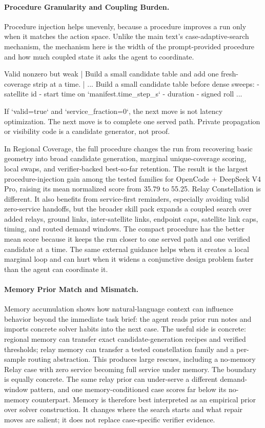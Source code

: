 \documentclass[]{mosi}
\newenvironment{promptblock}
  {\VerbatimEnvironment\par\smallskip\Needspace{10\baselineskip}\noindent\begin{promptblockinner}}
  {\end{promptblockinner}\par\smallskip}
\begin{document}
\paragraph{Procedure Granularity and Coupling Burden.} Procedure injection helps unevenly, because a procedure improves a run only when it matches the action space. Unlike the main text's case-adaptive-search mechanism, the mechanism here is the width of the prompt-provided procedure and how much coupled state it asks the agent to coordinate.
\begin{promptblock}
Valid nonzero but weak | Build a small candidate table and add one
fresh-coverage strip at a time. |
...
Build a small candidate table before dense sweeps:
- satellite id
- start time on `manifest.time_step_s`
- duration
- signed roll
...
\end{promptblock}
\begin{promptblock}
If `valid=true` and `service_fraction=0`, the next move is not latency
optimization. The next move is to complete one served path.
Private propagation or visibility code is a candidate generator, not proof.
\end{promptblock}
In Regional Coverage, the full procedure changes the run from recovering basic geometry into broad candidate generation, marginal unique-coverage scoring, local swaps, and verifier-backed best-so-far retention. The result is the largest procedure-injection gain among the tested families for OpenCode + DeepSeek V4 Pro, raising its mean normalized score from 35.79 to 55.25. Relay Constellation is different. It also benefits from service-first reminders, especially avoiding valid zero-service handoffs, but the broader skill pack expands a coupled search over added relays, ground links, inter-satellite links, endpoint caps, satellite link caps, timing, and routed demand windows. The compact procedure has the better mean score because it keeps the run closer to one served path and one verified candidate at a time. The same external guidance helps when it creates a local marginal loop and can hurt when it widens a conjunctive design problem faster than the agent can coordinate it.

\paragraph{Memory Prior Match and Mismatch.} Memory accumulation shows how natural-language context can influence behavior beyond the immediate task brief: the agent reads prior run notes and imports concrete solver habits into the next case.
The useful side is concrete: regional memory can transfer exact candidate-generation recipes and verified thresholds; relay memory can transfer a tested constellation family and a per-sample routing abstraction. This produces large rescues, including a no-memory Relay case with zero service becoming full service under memory. The boundary is equally concrete. The same relay prior can under-serve a different demand-window pattern, and one memory-conditioned case scores far below its no-memory counterpart. Memory is therefore best interpreted as an empirical prior over solver construction. It changes where the search starts and what repair moves are salient; it does not replace case-specific verifier evidence.
\end{document}
